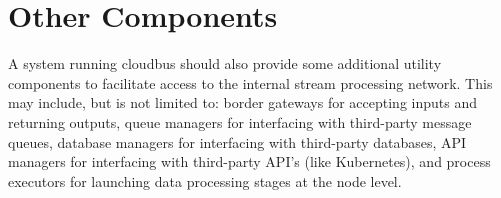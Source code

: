 \section{Other Components}
A system running cloudbus should also provide some additional utility components to facilitate access to the internal stream processing %
network. This may include, but is not limited to: border gateways for accepting inputs and returning outputs, queue managers for %
interfacing with third-party message queues, database managers for interfacing with third-party databases, API managers for interfacing %
with third-party API's (like Kubernetes), and process executors for launching data processing stages at the node level.